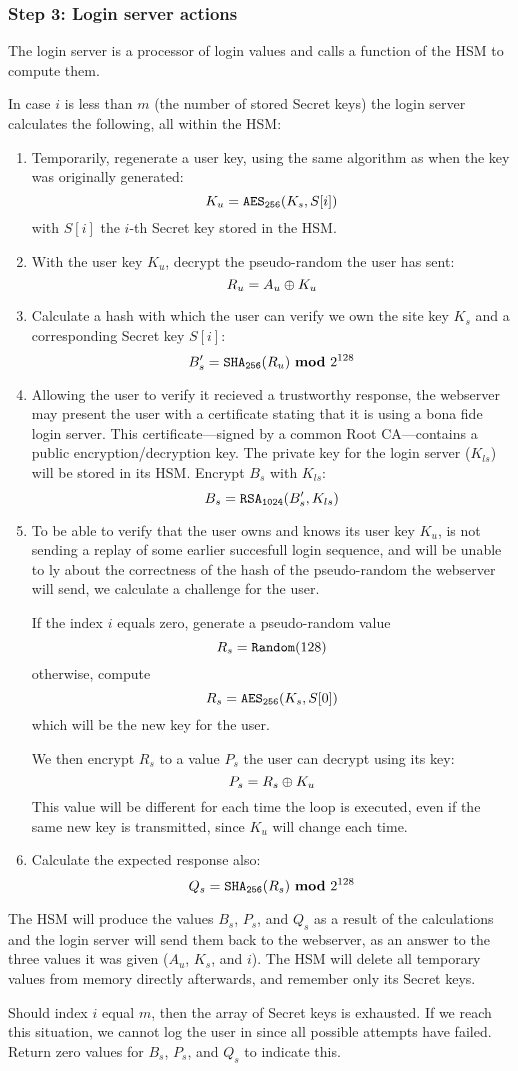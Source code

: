 \subsubsection{Step 3: Login server actions}
\label{sec:login_step3}
The login server is a processor of login values and calls a function of the HSM to compute them.
\par
In case $i$ is less than $m$
(the number of stored Secret keys)
the login server calculates the following, all within the HSM:
\begin{enumerate}
\item Temporarily, regenerate a user key, using the same algorithm as when the key was originally generated:
\[K_u=\texttt{\ensuremath{\mathtt{AES_{256}}}}(K_s,S[i])\]
with $S[i]$ the $i$-th Secret key stored in the HSM.
\item With the user key $K_u$, decrypt the pseudo-random the user has sent:
\[R_u=A_u\oplus K_u\]
\item Calculate a hash with which the user can verify we own the site key $K_s$ and a corresponding Secret key $S[i]$:
\[B_s'=\texttt{\ensuremath{\mathtt{SHA_{256}}}}(R_u)\ \textbf{mod}\ 2^{128}\]
\item Allowing the user to verify it recieved a trustworthy response,
the webserver may present the user with a certificate stating that it is using a bona fide login server.
This certificate---signed by a common Root CA---contains a public encryption/decryption key.
The private key for the login server ($K_{ls}$) will be stored in its HSM. 
Encrypt $B_s$ with $K_{ls}$:
\[B_s=\texttt{\ensuremath{\mathtt{RSA_{1024}}}}(B_s', K_{ls})\]
\item To be able to verify that the user owns and knows its user key $K_u$,
is not sending a replay of some earlier succesfull login sequence,
and will be unable to ly about the correctness of the hash of the pseudo-random the webserver will send,
we calculate a challenge for the user.
\par
If the index $i$ equals zero, generate a pseudo-random value
\[R_s=\texttt{Random}(128)\]
otherwise, compute
\[R_s=\texttt{\ensuremath{\mathtt{AES_{256}}}}(K_s,S[0])\]
which will be the new key for the user.
\par
We then encrypt $R_s$ to a value $P_s$ the user can decrypt using its key:
\[P_s=R_s\oplus K_u\]
This value will be different for each time the loop is executed,
even if the same new key is transmitted,
since $K_u$ will change each time.
\item Calculate the expected response also:
\[Q_s=\texttt{\ensuremath{\mathtt{SHA_{256}}}}(R_s)\ \textbf{mod}\ 2^{128}\]
\end{enumerate}
The HSM will produce the values $B_s$,
$P_s$,
and $Q_s$ as a result of the calculations and the login server will send them back to the webserver,
as an answer to the three values it was given ($A_u$, $K_s$, and $i$).
The HSM will delete all temporary values from memory directly afterwards, and remember only its Secret keys.
\par
Should index $i$ equal $m$, then the array of Secret keys is exhausted.
If we reach this situation, we cannot log the user in since all possible attempts have failed.
Return zero values for $B_s$, $P_s$, and $Q_s$ to indicate this.

